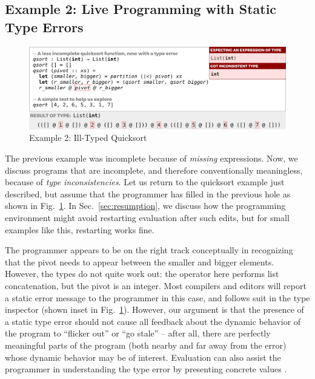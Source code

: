 

\subsection{Example 2: Live Programming with Static Type Errors}
\label{sec:static-errors}


\begin{figure}
\centering
\includegraphics[width=\textwidth,interpolate=false,valign=t]{images/qsort-type-error-inset.png}
\vspace{2px}
\caption{Example 2: Ill-Typed Quicksort}
\label{fig:qsort-type-error}
\vspace{-4px}
\end{figure}


The previous example was incomplete 
because of \emph{missing} expressions.
%
Now, we discuss programs that are incomplete, 
and therefore conventionally meaningless, because of
\emph{type inconsistencies}. 
%
Let us return to the quicksort example just described, 
but assume that the programmer has filled in the previous hole
as shown in Fig.~\ref{fig:qsort-type-error}. In Sec.~\ref{sec:resumption}, we discuss
how the programming environment might avoid restarting evaluation after such edits, but for small examples like this, restarting works fine.

The programmer appears to be on the right track conceptually
in recognizing that the pivot needs to appear between the 
smaller and bigger elements. 
However, the types do not quite work out: the  operator here
performs list concatenation, but the pivot is an integer. 
Most compilers and editors will report a static error message
to the programmer in this case, and \Hazel 
follows suit in the type inspector (shown inset in Fig.~\ref{fig:qsort-type-error}). 
However, our argument is that the presence of a static type error should not cause all feedback about 
the dynamic behavior of the program to ``flicker out'' or ``go stale'' --
after all, there are perfectly meaningful parts of the program (both nearby
and far away from the error) 
whose dynamic behavior may be of interest. Evaluation can also assist the programmer in understanding the type error by presenting concrete values \cite{Seidel2016}.

